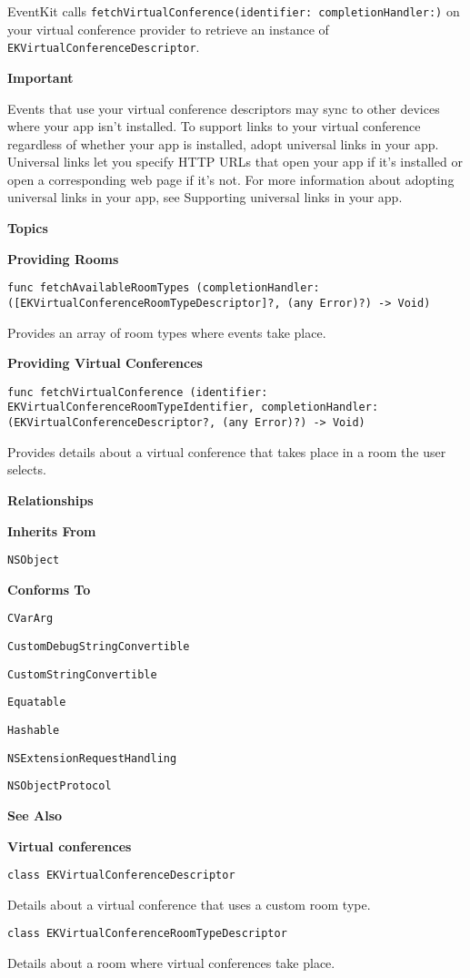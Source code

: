 \documentclass{article}
\begin{document}
EventKit calls \texttt{fetchVirtualConference(identifier: completionHandler:)} on your virtual conference provider to retrieve an instance of \texttt{EKVirtualConferenceDescriptor}.

\textbf{Important}

Events that use your virtual conference descriptors may sync to other devices where your app isn't installed. To support links to your virtual conference regardless of whether your app is installed, adopt universal links in your app. Universal links let you specify HTTP URLs that open your app if it's installed or open a corresponding web page if it's not. For more information about adopting universal links in your app, see Supporting universal links in your app.

\textbf{Topics}

\textbf{Providing Rooms}

\texttt{func fetchAvailableRoomTypes (completionHandler: ([EKVirtualConferenceRoomTypeDescriptor]?, (any Error)?) -> Void)}

Provides an array of room types where events take place.

\textbf{Providing Virtual Conferences}

\texttt{func fetchVirtualConference (identifier: EKVirtualConferenceRoomTypeIdentifier, completionHandler: (EKVirtualConferenceDescriptor?, (any Error)?) -> Void)}

Provides details about a virtual conference that takes place in a room the user selects.

\textbf{Relationships}

\textbf{Inherits From}

\texttt{NSObject}

\textbf{Conforms To}

\texttt{CVarArg}

\texttt{CustomDebugStringConvertible}

\texttt{CustomStringConvertible}

\texttt{Equatable}

\texttt{Hashable}

\texttt{NSExtensionRequestHandling}

\texttt{NSObjectProtocol}

\textbf{See Also}

\textbf{Virtual conferences}

\texttt{class EKVirtualConferenceDescriptor}

Details about a virtual conference that uses a custom room type.

\texttt{class EKVirtualConferenceRoomTypeDescriptor}

Details about a room where virtual conferences take place.

\newpage
\end{document}

